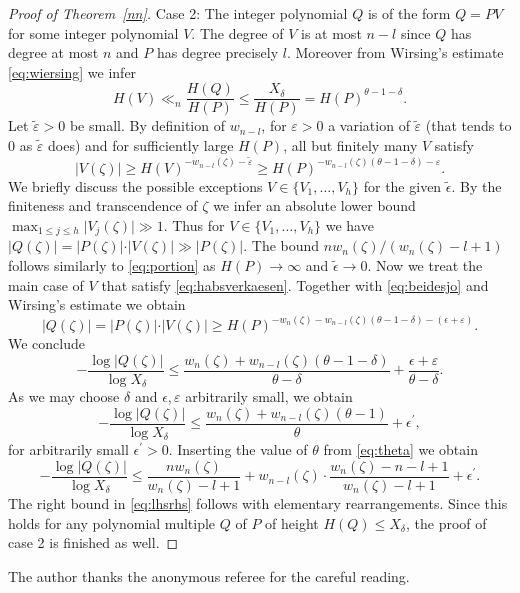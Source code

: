 \documentclass[12pt]{amsart}
\theoremstyle{definition}
\begin{document}
\begin{proof} [Proof of Theorem~\ref{nn}]
Case 2: The integer polynomial $Q$ is
of the form $Q=PV$ for some integer polynomial $V$. The 
degree of $V$ is at most $n-l$ since
$Q$ has degree at most $n$ and $P$ has degree precisely $l$. Moreover from Wirsing's estimate \eqref{eq:wiersing} we infer
\[
H(V)\ll_{n} \frac{H(Q)}{H(P)}\leq \frac{X_{\delta}}{H(P)}= H(P)^{\theta-1-\delta}.
\]
Let $\tilde{\varepsilon}>0$ be small. By definition of $w_{n-l}$, for $\varepsilon>0$ a variation of 
$\tilde{\varepsilon}$ (that tends to $0$ as $\tilde{\varepsilon}$ does) and for sufficiently large $H(P)$, 
all but finitely many $V$ satisfy
\begin{equation}  \label{eq:habsverkaesen}
\vert V(\zeta)\vert \geq H(V)^{-w_{n-l}(\zeta)-\tilde{\varepsilon}}\geq  H(P)^{-w_{n-l}(\zeta)(\theta-1-\delta)-\varepsilon}.
\end{equation}
We briefly discuss the possible exceptions 
$V\in\{V_{1},\ldots,V_{h}\}$ for the given $\tilde{\epsilon}$. 
By the finiteness and transcendence of $\zeta$ we infer an absolute lower bound $\max_{1\leq j\leq h} \vert V_{j}(\zeta)\vert \gg 1$. 
Thus for $V\in\{V_{1},\ldots,V_{h}\}$ we 
have $\vert Q(\zeta)\vert= \vert P(\zeta)\vert \cdot \vert V(\zeta)\vert \gg \vert P(\zeta)\vert$. 
The bound $nw_{n}(\zeta)/(w_{n}(\zeta)-l+1)$ follows similarly to \eqref{eq:portion} as $H(P)\to\infty$
and $\tilde{\epsilon}\to 0$. Now we treat the main case 
of $V$ that satisfy \eqref{eq:habsverkaesen}.
Together with \eqref{eq:beidesjo} and Wirsing's estimate we obtain
\[
\vert Q(\zeta)\vert = \vert P(\zeta)\vert\cdot \vert V(\zeta)\vert 
\geq H(P)^{-w_{n}(\zeta)-w_{n-l}(\zeta)(\theta-1-\delta)-(\epsilon+\varepsilon)}.
\]
We conclude
\[
-\frac{\log \vert Q(\zeta)\vert}{\log X_{\delta}} \leq 
\frac{w_{n}(\zeta)+w_{n-l}(\zeta)(\theta-1-\delta)}{\theta-\delta}+\frac{\epsilon+\varepsilon}{\theta-\delta}.
\]
As we may choose $\delta$ and $\epsilon, \varepsilon$ arbitrarily small, we obtain
\[
-\frac{\log \vert Q(\zeta)\vert}{\log X_{\delta}} \leq  
\frac{w_{n}(\zeta)+w_{n-l}(\zeta)(\theta-1)}{\theta}+\epsilon^{\prime},
\]
for arbitrarily small $\epsilon^{\prime}>0$. 
Inserting the value of $\theta$ from \eqref{eq:theta} we obtain
\[
-\frac{\log \vert Q(\zeta)\vert}{\log X_{\delta}} \leq 
\frac{nw_{n}(\zeta)}{w_{n}(\zeta)-l+1}+w_{n-l}(\zeta)\cdot \frac{w_{n}(\zeta)-n-l+1}{w_{n}(\zeta)-l+1}+\epsilon^{\prime}.
\]
The right bound in \eqref{eq:lhsrhs} follows with elementary rearrangements. 
Since this holds for any polynomial multiple $Q$ of $P$ of height $H(Q)\leq X_{\delta}$, 
the proof of case 2 is finished as well.
\end{proof}



 \vspace{1cm}
 
 The author thanks the anonymous 
 referee for the 
 careful reading.
\end{document}
